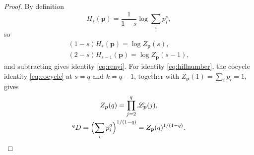 \documentclass[sn-mathphys-num]{sn-jnl}
\theoremstyle{thmstyleone}%
\theoremstyle{thmstyletwo}%
\theoremstyle{thmstylethree}%
\theoremstyle{thmstyleone}%
\providecommand{\Leh}{\mathscr{L}}
\providecommand{\pp}{\boldsymbol p}
\begin{document}
\begin{appendices}
		\begin{proof}
			By definition
			\begin{equation}\label{eq:renyidef}
				H_s(\pp)=\frac{1}{1-s}\log\sum_ip_i^{s},
			\end{equation}
			so
			\begin{equation}\label{eq:renyihillproof}
				\begin{gathered}
					(1-s)H_s(\pp)=\log Z_{\pp}(s),\\
					(2-s)H_{s-1}(\pp)=\log Z_{\pp}(s-1),
				\end{gathered}
			\end{equation}
			and subtracting gives identity \eqref{eq:renyi}. For identity
			\eqref{eq:hillnumber}, the cocycle identity \eqref{eq:cocycle} at
			$s=q$ and $k=q-1$, together with $Z_{\pp}(1)=\sum_ip_i=1$, gives
			\begin{equation}\label{eq:hillproof}
				\begin{gathered}
					Z_{\pp}(q)=\prod_{j=2}^{q}\Leh_{\pp}(j),\\
					{}^{q}D=\Bigl(\sum_ip_i^q\Bigr)^{1/(1-q)}
					=Z_{\pp}(q)^{1/(1-q)} .
				\end{gathered}
			\end{equation}
		\end{proof}
		
	\end{appendices}
	
\end{document}
